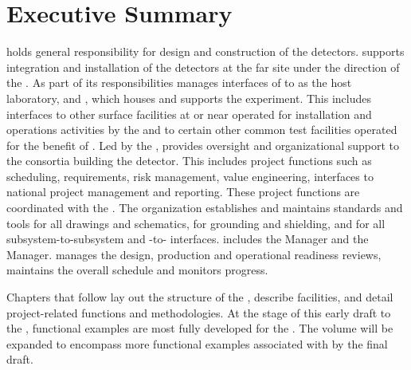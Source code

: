 \chapter{Executive Summary}
\label{vl:tc-execsum}


  holds general responsibility for design and
construction of the  detectors.  supports
integration and installation of the detectors at the far site under
the direction of the .  As part of its responsibilities
 manages interfaces of  to  as the host
laboratory,  and , which houses and supports
the  experiment. This includes interfaces to other surface
facilities at or near  operated for installation and
operations activities by the  and to certain other common test
facilities operated for the benefit of . Led by the
 ,   provides
oversight and organizational support to the consortia building the
 detector.  This includes project functions such as
scheduling, requirements, risk management, value engineering,
interfaces to national project management and reporting. These project
functions are coordinated with the .  The 
organization establishes and maintains standards and tools for all
drawings and schematics, for grounding and shielding, and for all 
subsystem-to-subsystem and -to- interfaces.
 includes the   Manager
and the   Manager. 
 manages the design, production and operational readiness
reviews, maintains the overall schedule and monitors progress.

Chapters that follow lay out the structure of the  ,
describe  facilities, and detail project-related functions
and methodologies. At the stage of this early draft to the  ,
  functional examples are most fully developed
for the  . The volume will be expanded to
encompass more functional examples associated with 
 by the final draft.

